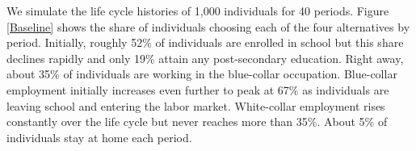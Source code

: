 \noindent We simulate the life cycle histories of 1,000 individuals for 40 periods. Figure \ref{Baseline} shows the share of individuals choosing each of the four alternatives by period. Initially, roughly 52\% of individuals are enrolled in school but this share declines rapidly and only 19\% attain any post-secondary education. Right away, about 35\% of individuals are working in the blue-collar occupation.  Blue-collar employment initially increases even further to peak at 67\% as individuals are leaving school and entering the labor market. White-collar employment rises constantly over the life cycle but never reaches more than 35\%. About 5\% of individuals stay at home each period.

%
